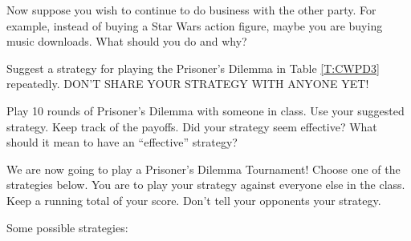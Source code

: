 \begin{xca}\label{E:internetpurchaserepeat}
Now suppose you wish to continue to do business with the other party. For example, instead of buying a Star Wars action figure, maybe you are buying music downloads. What should you do and why?
\end{xca}

\begin{xca}\label{E:RPDstrategy}
Suggest a strategy for playing the Prisoner's Dilemma in Table \ref{T:CWPD3} repeatedly. DON'T SHARE YOUR STRATEGY WITH ANYONE YET! 
\end{xca}

\begin{xca}\label{E:RPDplay}
Play 10 rounds of Prisoner's Dilemma with someone in class. Use your suggested strategy. Keep track of the payoffs. Did your strategy seem effective? What should it mean to have an ``effective'' strategy?
\end{xca}

We are now going to play a Prisoner's Dilemma Tournament! Choose one of the strategies below. You are to play your strategy against everyone else in the class. Keep a running total of your score. Don't tell your opponents your strategy. 


Some possible strategies:

